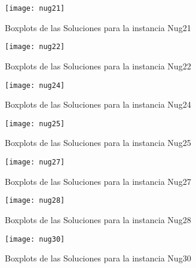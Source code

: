 \documentclass{ci5652}
\begin{document}
\begin{figure}[ht]
  \caption{Boxplots de las Soluciones para la instancia Nug21}
  \texttt{[image: nug21]}
    \centering
    \label{fig:boxplot_nug21}
\end{figure}

\begin{figure}[ht]
  \caption{Boxplots de las Soluciones para la instancia Nug22}
  \texttt{[image: nug22]}
    \centering
    \label{fig:boxplot_nug22}
\end{figure}

\begin{figure}[ht]
  \caption{Boxplots de las Soluciones para la instancia Nug24}
  \texttt{[image: nug24]}
    \centering
    \label{fig:boxplot_nug24}
\end{figure}

\begin{figure}[ht]
  \caption{Boxplots de las Soluciones para la instancia Nug25}
  \texttt{[image: nug25]}
    \centering
    \label{fig:boxplot_nug25}
\end{figure}

\begin{figure}[ht]
  \caption{Boxplots de las Soluciones para la instancia Nug27}
  \texttt{[image: nug27]}
    \centering
    \label{fig:boxplot_nug27}
\end{figure}

\begin{figure}[ht]
  \caption{Boxplots de las Soluciones para la instancia Nug28}
  \texttt{[image: nug28]}
    \centering
    \label{fig:boxplot_nug28}
\end{figure}

\begin{figure}[ht]
  \caption{Boxplots de las Soluciones para la instancia Nug30}
  \texttt{[image: nug30]}
    \centering
    \label{fig:boxplot_nug30}
\end{figure}
\end{document}
